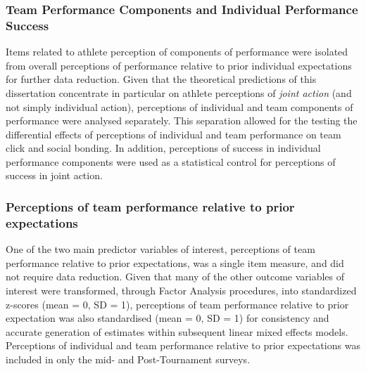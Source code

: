 \begin{CJK}{UTF8}{gbsn}
\subsubsection{Team Performance Components and Individual Performance Success}
Items related to athlete perception of components of performance were isolated from overall perceptions of performance relative to prior individual expectations for further data reduction. Given that the theoretical predictions of this dissertation concentrate in particular on athlete perceptions of \textit{joint action} (and not simply individual action), perceptions of individual and team components of performance were analysed separately. This separation allowed for the testing the differential effects of perceptions of individual and team performance on team click and social bonding. In addition, perceptions of success in individual performance components were used as a statistical control for perceptions of success in joint action.


\subsubsection{Perceptions of team performance relative to prior expectations}
One of the two main predictor variables of interest, perceptions of team performance relative to prior expectations, was a single item measure, and did not require data reduction.  Given that many of the other outcome variables of interest were transformed, through Factor Analysis procedures, into standardized z-scores (mean = 0, SD = 1), perceptions of team performance relative to prior expectation was also standardised (mean = 0, SD = 1) for consistency and accurate generation of estimates within subsequent linear mixed effects models. Perceptions of individual and team performance relative to prior expectations was included in only the mid- and Post-Tournament surveys.


































\end{CJK}
